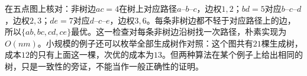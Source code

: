 在五点图上核对：非树边$ac=4$在树上对应路径$a\text{--}b\text{--}c$，边权$1,2$；$bd=5$对应$b\text{--}c\text{--}d$，边权$2,3$；$de=7$对应$d\text{--}c\text{--}e$，边权$3,6$。每条非树边都不轻于对应路径上的边，所以$\{ab,bc,cd,ce\}$最优。这一检查对每条非树边沿树找一次路径，朴素实现为$O(nm)$。小规模的例子还可以枚举全部生成树作对照：这个图共有$21$棵生成树，成本$12$的只有上面这一棵，次优的成本为$13$。但两种算法在某个例子上给出相同的树，只是一致性的旁证，不能当作一般正确性的证明。
